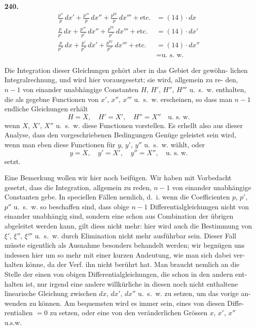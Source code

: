 \documentclass[12pt,a4paper]{article}
\begin{document}
\newpage
\noindent\textbf{240.}\quad
\begin{align*}
\frac{p''}{p}\,dx' + \frac{p'''}{p}\,dx'' + \frac{p^{\mathrm{IV}}}{p}\,dx''' + \text{etc.}
&= (14)\cdot dx\\
\frac{p}{p'}\,dx + \frac{p'''}{p'}\,dx'' + \frac{p^{\mathrm{IV}}}{p'}\,dx''' + \text{etc.}
&= (14)\cdot dx'\\
\frac{p}{p''}\,dx + \frac{p'}{p''}\,dx' + \frac{p^{\mathrm{IV}}}{p''}\,dx''' + \text{etc.}
&= (14)\cdot dx''\\
&= \text{u.~s.~w.}
\end{align*}

\smallskip\noindent
Die Integration dieser Gleichungen gehört aber in das Gebiet der gewöhn-
lichen Integralrechnung, und wird hier vorausgesetzt; sie wird, allgemein zu re-
den, $n-1$ von einander unabhängige Constanten $H$, $H'$, $H''$, $H'''$ u.~s.~w.
enthalten, die als gegebne Functionen von $x'$, $x''$, $x'''$ u.~s.~w. erscheinen, so dass man $n-1$
endliche Gleichungen erhält
\begin{equation*}
H = X, \quad H' = X', \quad H'' = X'' \quad \text{u.~s.~w.}
\end{equation*}
wenn $X$, $X'$, $X''$ u.~s.~w. diese Functionen vorstellen. Es erhellt also aus dieser
Analyse, dass den vorgeschriebenen Bedingungen Genüge geleistet sein wird,
wenn man eben diese Functionen für $y$, $y'$, $y''$ u.~s.~w. wählt, oder
\begin{equation*}
y = X, \quad y' = X', \quad y'' = X'', \quad \text{u.~s.~w.}
\end{equation*}
setzt.

\smallskip\noindent
Eine Bemerkung wollen wir hier noch beifügen. Wir haben mit Vorbedacht
gesetzt, dass die Integration, allgemein zu reden, $n-1$ von einander unabhängige
Constanten gebe. In speciellen Fällen nemlich, d.~i. wenn die Coefficienten
$p$, $p'$, $p''$ u.~s.~w. so beschaffen sind, dass obige $n-1$ Differentialgleichungen nicht
von einander unabhängig sind, sondern eine schon aus Combination der übrigen
abgeleitet werden kann, gilt diess nicht mehr: hier wird auch die Bestimmung
von $\xi'$, $\xi''$, $\xi'''$ u.~s.~w. durch Elimination nicht mehr ausführbar sein. Dieser Fall
müsste eigentlich als Ausnahme besonders behandelt werden; wir begnügen uns
indessen hier um so mehr mit einer kurzen Andeutung, wie man sich dabei ver-
halten könne, da der Verf. ihn nicht berührt hat. Man braucht nemlich an die
Stelle der einen von obigen Differentialgleichungen, die schon in den andern ent-
halten ist, nur irgend eine andere willkürliche in diesen noch nicht enthaltene
linearische Gleichung zwischen $dx$, $dx'$, $dx''$ u.~s.~w. zu setzen, um das vorige an-
wenden zu können. Am bequemsten wird es immer sein, eines von diesen Diffe-
rentialien $=0$ zu setzen, oder eine von den veränderlichen Grössen $x$, $x'$, $x''$ u.s.w.
\end{document}
